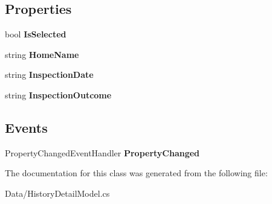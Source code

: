 \subsection*{Properties}
\begin{DoxyCompactItemize}
\item 
\mbox{\label{class_a_f_h___scheduler_1_1_data_1_1_history_detail_model_a1684c1243cced887212660d3912fccbd}} 
bool {\bfseries Is\+Selected}\hspace{0.3cm}{\ttfamily  [get, set]}
\item 
\mbox{\label{class_a_f_h___scheduler_1_1_data_1_1_history_detail_model_afa4743c9985a415e427ee8cefffe9fe2}} 
string {\bfseries Home\+Name}\hspace{0.3cm}{\ttfamily  [get, set]}
\item 
\mbox{\label{class_a_f_h___scheduler_1_1_data_1_1_history_detail_model_a2fce15552f1be1fee8e63010670a5204}} 
string {\bfseries Inspection\+Date}\hspace{0.3cm}{\ttfamily  [get, set]}
\item 
\mbox{\label{class_a_f_h___scheduler_1_1_data_1_1_history_detail_model_ad08251f98e173f1d691ec86974f9d5a0}} 
string {\bfseries Inspection\+Outcome}\hspace{0.3cm}{\ttfamily  [get, set]}
\end{DoxyCompactItemize}
\subsection*{Events}
\begin{DoxyCompactItemize}
\item 
\mbox{\label{class_a_f_h___scheduler_1_1_data_1_1_history_detail_model_a2134f8a5b8c73c9ba313c114c1185f2a}} 
Property\+Changed\+Event\+Handler {\bfseries Property\+Changed}
\end{DoxyCompactItemize}


The documentation for this class was generated from the following file\+:\begin{DoxyCompactItemize}
\item 
Data/History\+Detail\+Model.\+cs\end{DoxyCompactItemize}
